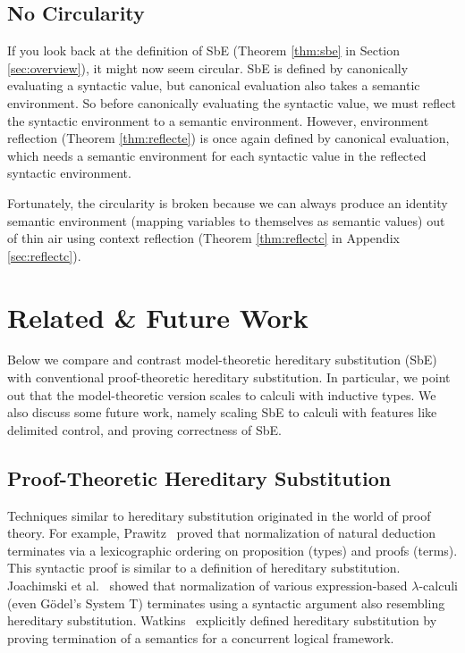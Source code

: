 \documentclass[runningheads,a4paper]{llncs}
\newcommand{\refthm}[1]{Theorem \ref{thm:#1}}
\newcommand{\refapp}[1]{Appendix \ref{sec:#1}}
\newcommand{\refsec}[1]{Section \ref{sec:#1}}
\begin{document}
\subsection{No Circularity}

If you look back at the definition of SbE (\refthm{sbe} in
\refsec{overview}), it might now seem circular. SbE is defined by
canonically evaluating a syntactic value, but canonical evaluation
also takes a semantic environment. So before canonically evaluating
the syntactic value, we must reflect the syntactic environment to a
semantic environment. However, environment reflection (\refthm{reflecte}) is once again
defined by canonical evaluation, which needs a semantic environment
for each syntactic value in the reflected syntactic environment.

Fortunately, the circularity is broken because we can always produce
an identity semantic environment (mapping variables to themselves as
semantic values) out of thin air using context reflection
(\refthm{reflectc} in \refapp{reflectc}).

\section{Related \& Future Work}
\label{sec:related}

Below we compare and contrast model-theoretic hereditary substitution
(SbE) with conventional proof-theoretic hereditary substitution. In
particular, we point out that the model-theoretic version scales to
calculi with inductive types. We also discuss some future work, namely
scaling SbE to calculi with features like delimited control, and
proving correctness of SbE.

\subsection{Proof-Theoretic Hereditary Substitution}

Techniques similar to hereditary substitution originated in the world
of proof theory. For example, Prawitz~\cite{prawitz} proved that
normalization of natural deduction terminates via a lexicographic
ordering on proposition (types) and proofs (terms). This syntactic
proof is similar to a definition of hereditary substitution.
Joachimski et al.~\cite{permutative} showed that normalization of
various expression-based $\lambda$-calculi (even G{\"o}del's System T)
terminates using a syntactic argument also resembling hereditary
substitution. Watkins~\cite{watkins} explicitly defined
hereditary substitution by proving termination of a semantics for a concurrent
logical framework.
\end{document}
